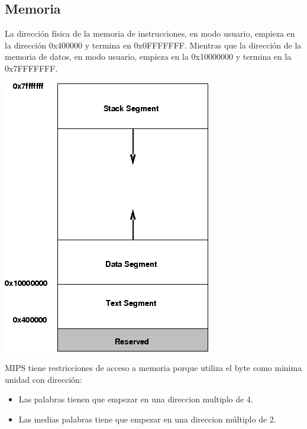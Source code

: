 \documentclass[12pt]{article}
\begin{document}
\subsection{Memoria}
La dirección física de la memoria de instrucciones, en modo usuario, empieza en la dirección 0x400000 y termina en 0x0FFFFFFF. Mientras que la dirección de la memoria
de datos, en modo usuario, empieza en la 0x10000000 y termina en la 0x7FFFFFFF.
\begin{center}
\includegraphics[height=\dimexpr\pagegoal-\pagetotal-\baselineskip\relax,width=\textwidth,keepaspectratio]{gmemory.png}
\end{center}
MIPS tiene restricciones de acceso a memoria porque utiliza el byte como minima unidad con dirección:
\begin{itemize}
\item Las palabras tienen que empezar en una direccion multiplo de 4.
\item Las medias palabras tiene que empezar en una direccion múltiplo de 2.
\end{itemize}
\end{document}
